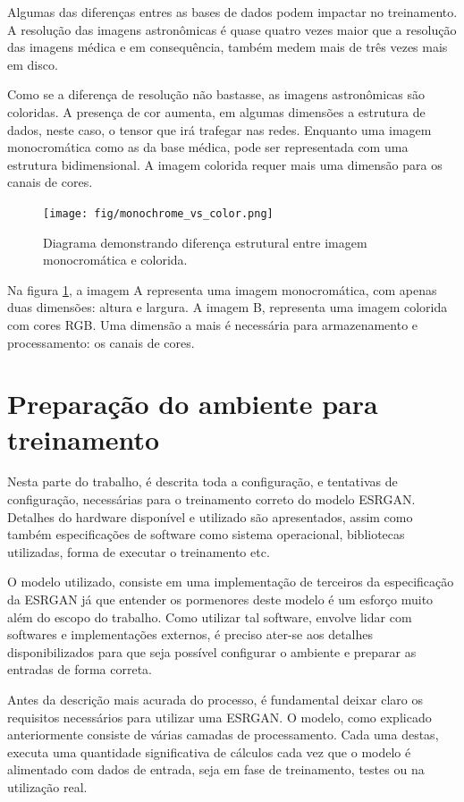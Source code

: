 Algumas das diferenças entres as bases de dados podem impactar no treinamento. A resolução das imagens astronômicas é quase quatro vezes maior que a resolução das imagens médica e em consequência, também medem mais de três vezes mais em disco.

Como se a diferença de resolução não bastasse, as imagens astronômicas são coloridas. A presença de cor aumenta, em algumas dimensões a estrutura de dados, neste caso, o tensor que irá trafegar nas redes. Enquanto uma imagem monocromática como as da base médica, pode ser representada com uma estrutura bidimensional. A imagem colorida requer mais uma dimensão para os canais de cores.

\begin{figure}[H]
    \centering
    \caption{Diagrama demonstrando diferença estrutural entre imagem monocromática e colorida.}
    \texttt{[image: fig/monochrome\_vs\_color.png]}
    \label{fig:monochrome_vs_color}
\end{figure}

Na figura \ref{fig:monochrome_vs_color}, a imagem A representa uma imagem monocromática, com apenas duas dimensões: altura e largura. A imagem B, representa uma imagem colorida com cores RGB. Uma dimensão a mais é necessária para armazenamento e processamento: os canais de cores.

\section{Preparação do ambiente para treinamento}
\label{sec:environment-prep-training}


Nesta parte do trabalho, é descrita toda a configuração, e tentativas de configuração, necessárias para o treinamento correto do modelo ESRGAN. Detalhes do hardware disponível e utilizado são apresentados, assim como também especificações de software como sistema operacional, bibliotecas utilizadas, forma de executar o treinamento etc.

O modelo utilizado, consiste em uma implementação de terceiros da especificação da ESRGAN já que entender os pormenores deste modelo é um esforço muito além do escopo do trabalho. Como utilizar tal software, envolve lidar com softwares e implementações externos, é preciso ater-se aos detalhes disponibilizados para que seja possível configurar o ambiente e preparar as entradas de forma correta.

Antes da descrição mais acurada do processo, é fundamental deixar claro os requisitos necessários para utilizar uma ESRGAN. O modelo, como explicado anteriormente consiste de várias camadas de processamento. Cada uma destas, executa uma quantidade significativa de cálculos cada vez que o modelo é alimentado com dados de entrada, seja em fase de treinamento, testes ou na utilização real.

